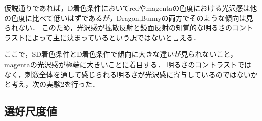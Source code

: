         仮説通りであれば，D着色条件においてredやmagentaの色度における光沢感は他の色度に比べて低いはずであるが，Dragon,Bunnyの両方でそのような傾向は見られない．
        このため，光沢感が拡散反射と鏡面反射の知覚的な明るさのコントラストによって主に決まっているという訳ではないと言える．

        ここで，SD着色条件とD着色条件で傾向に大きな違いが見られないこと，magentaの光沢感が極端に大きいことに着目する．
        明るさのコントラストではなく，刺激全体を通して感じられる明るさが光沢感に寄与しているのではないかと考え，次の実験2を行った．

    \subsection{選好尺度値}